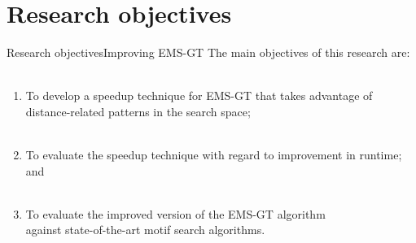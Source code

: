 \documentclass[pdf,xcolor={dvipsnames}]{beamer}
\begin{document}
\section{Research objectives}
	\begin{frame}{Research objectives}{Improving EMS-GT}
		The main objectives of this research are:\\ \ \\
		\begin{enumerate}
		\item To {develop a speedup technique} for EMS-GT that takes advantage of distance-related patterns in the search space;\\ \ \\
		\item To {evaluate} the speedup technique with regard to {improvement in runtime}; and\\ \ \\
		\item To {evaluate} the improved version of the EMS-GT algorithm\\ {against state-of-the-art} motif search algorithms.
		\end{enumerate}
		\end{frame}
	

		
\end{document}
